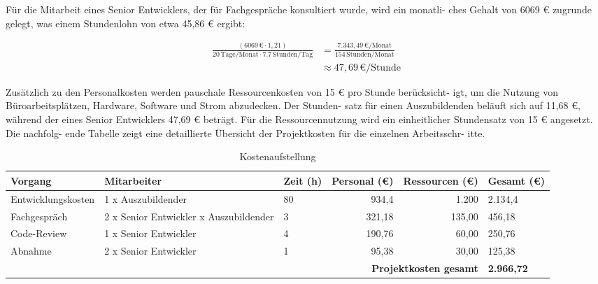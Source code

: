 Für die Mitarbeit eines Senior Entwicklers, der für Fachgespräche konsultiert wurde, wird ein monatli-
ches Gehalt von 6069 € zugrunde gelegt, was einem Stundenlohn von etwa 45,86 € ergibt:

\begin{align}
    \frac{(6069 \, \text{€} \cdot 1,21)}{20 \, \text{Tage/Monat} \cdot 7.7 \, \text{Stunden/Tag}} &= \frac{7.343,49 \, \text{€/Monat}}{154 \, \text{Stunden/Monat}} \tag{1} \\
    &\approx 47,69 \, \text{€/Stunde} \tag{2}
\end{align}

Zusätzlich zu den Personalkosten werden pauschale Ressourcenkosten von 15 € pro Stunde berücksicht-
igt, um die Nutzung von Büroarbeitsplätzen, Hardware, Software und Strom abzudecken. Der Stunden-
satz für einen Auszubildenden beläuft sich auf 11,68 €, während der eines Senior Entwicklers 47,69 € beträgt. Für die Ressourcennutzung wird ein einheitlicher Stundensatz von 15 € angesetzt. Die nachfolg-
ende Tabelle zeigt eine detaillierte Übersicht der Projektkosten für die einzelnen Arbeitsschr-
itte.
\begin{table}[h!]
    \centering
    \footnotesize %
    \renewcommand{\arraystretch}{1.2} %
    \setlength{\tabcolsep}{7pt} %
    \begin{tabular*}{\textwidth}{|p{2.7cm}|p{3.0cm}|p{1.5cm}|r|r|p{1.9cm}|} %
    \hline
    \textbf{Vorgang}       & \textbf{Mitarbeiter}                 & \textbf{Zeit (h)} & \textbf{Personal (€)\footnotemark[6]} & \textbf{Ressourcen (€)\footnotemark[7]} & \textbf{Gesamt (€)} \\ \hline
    Entwicklungskosten     & 1 x Auszubildender                  & 80                & 934,4                 & 1.200                 & 2.134,4           \\ \hline
    Fachgespräch           & 2 x Senior Entwickler\newline 1 x Auszubildender & 3                 & 321,18                 & 135,00                   & 456,18             \\ \hline
    Code-Review            & 1 x Senior Entwickler                      & 4                 & 190,76                 & 60,00                    & 250,76             \\ \hline
    Abnahme                & 2 x Senior Entwickler                      & 1                 & 95,38                  & 30,00                    & 125,38              \\ \hline
    \multicolumn{5}{|r|}{\textbf{Projektkosten gesamt}} & \textbf{2.966,72} \\ \hline
    \end{tabular*}
    \caption{Kostenaufstellung}
    \label{tab:Kostenaufstellung}
\end{table}

